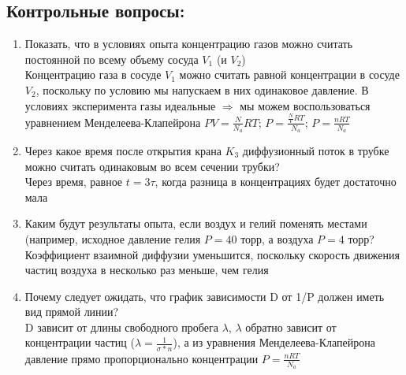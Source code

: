 \documentclass[a4paper,12pt]{article}
\begin{document}
\subsection{Контрольные вопросы:}
\begin{enumerate}
\itemsep0em
\item Показать, что в условиях опыта концентрацию газов можно считать постоянной по всему объему сосуда $V_1$ (и $V_2$)\\
Концентрацию газа в сосуде $V_1$ можно считать равной концентрации в сосуде $V_2$, поскольку по условию мы напускаем в них одинаковое давление. В условиях эксперимента газы идеальные $\Longrightarrow$ мы можем воспользоваться уравнением Менделеева-Клапейрона $PV = \frac{N}{N_{a}}RT$; $P = \frac{\frac{N}{V}RT}{N_{a}}$; $P = \frac{nRT}{N_{a}}$
\item Через какое время после открытия крана $K_3$ диффузионный поток в трубке можно считать одинаковым во всем сечении трубки? \\
Через время, равное $t = 3\tau$, когда разница в концентрациях будет достаточно мала
\item Каким будут результаты опыта, если воздух и гелий поменять местами (например, исходное давление гелия $P = 40$ торр, а воздуха $P = 4$ торр? \\
Коэффициент взаимной диффузии уменьшится, поскольку скорость движения частиц воздуха в несколько раз меньше, чем гелия 

\item Почему следует ожидать, что график зависимости D от 1/P должен иметь вид прямой линии? \\
D зависит от длины свободного пробега $\lambda$, $\lambda$ обратно зависит от концентрации частиц ($\lambda = \frac{1}{\sigma*n}$), а из уравнения Менделеева-Клапейрона давление прямо пропорционально концентрации $P = \frac{nRT}{N_{a}}$
\end{enumerate}
\end{document}
